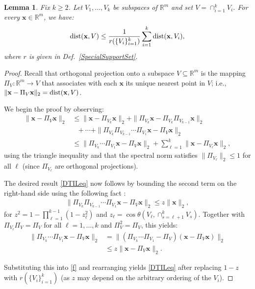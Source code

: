 \documentclass[9pt,twocolumn]{pnas-new}
\newtheorem{lemma}{Lemma}
\begin{document}
\begin{lemma}\label{DistanceToIntersectionLemma}
Fix $k \geq 2$. Let $V_1, \ldots, V_k$ be subspaces of $\mathbb{R}^m$ and set $V = \cap_{i = 1}^k V_i$. For every $\mathbf{x} \in \mathbb{R}^m$, we have:
\begin{align}\label{DTILeq}
\text{\rm dist}(\mathbf{x}, V) \leq \frac{1}{r(\{V_i\}_{i = 1}^k)} \sum_{i=1}^k \text{\rm dist}(\mathbf{x}, V_i),
\end{align}
where $r$ is given in Def.~\ref{SpecialSupportSet}.
\end{lemma}
\begin{proof} 
Recall that orthogonal projection onto a subspace $V \subseteq \mathbb{R}^m$ is the mapping $\Pi_V: \mathbb{R}^m \to V$ that associates with each $\mathbf{x}$ its unique nearest point in $V$; i.e., $\|\mathbf{x} - \Pi_V\mathbf{x}\|_2 = \text{\rm dist}(\mathbf{x}, V)$.

We begin the proof by observing:
\begin{align}\label{f}
\|\mathbf{x} - \Pi_V\mathbf{x}\|_2 &\leq \|\mathbf{x} - \Pi_{V_k} \mathbf{x}\|_2 + \|\Pi_{V_k}  \mathbf{x} - \Pi_{V_k}\Pi_{V_{k-1}}\mathbf{x}\|_2 \nonumber \\
&\ \ \ + \cdots + \|\Pi_{V_k} \Pi_{V_{k-1}}\cdots \Pi_{V_1} \mathbf{x} - \Pi_V \mathbf{x}\|_2 \nonumber \\
&\leq \|\Pi_{V_k}\cdots\Pi_{V_{1}} \mathbf{x} - \Pi_V \mathbf{x}\|_2 + \sum_{\ell=1}^k \|\mathbf{x} - \Pi_{V_{\ell}} \mathbf{x}\|_2,
\end{align}
%
using the triangle inequality and that the spectral norm satisfies $\|\Pi_{V_{\ell}}\|_2 \leq 1$ for all $\ell$ (since $\Pi_{V_{\ell}}$ are orthogonal projections).

The desired result \eqref{DTILeq} now follows by bounding the second term on the right-hand side using the following fact \cite[Thm.~9.33]{Deutsch12}:
\begin{align}
\|\Pi_{V_k}\Pi_{V_{k-1}}\cdots\Pi_{V_1} \mathbf{x} - \Pi_V\mathbf{x}\|_2 \leq z \|\mathbf{x}\|_2, %
\end{align}
for \mbox{$z^2= 1 - \prod_{\ell =1}^{k-1}(1-z_{\ell}^2)$} and \mbox{$z_{\ell} = \cos\theta\left(V_{\ell}, \cap_{s=\ell+1}^k V_s\right)$}. Together with $\Pi_{V_\ell} \Pi_V = \Pi_V$ for all $\ell = 1, \ldots, k$ and $\Pi_V^2 = \Pi_V$, this yields:
\begin{align*}
\|\Pi_{V_k} \cdots \Pi_{V_1}\mathbf{x}  - \Pi_V \mathbf{x} \|_2 
&= \|\left( \Pi_{V_k} \cdots\Pi_{V_1} - \Pi_V \right) (\mathbf{x} - \Pi_V\mathbf{x})\|_2 \\
&\leq z\|\mathbf{x} - \Pi_V\mathbf{x}\|_2.
\end{align*}

Substituting this into \eqref{f} and rearranging yields \eqref{DTILeq} after replacing $1 - z$ with $r(\{V_i\}_{i=1}^k)$ (as $z$ may depend on the arbitrary ordering of the $V_i$).
\end{proof}
\end{document}
